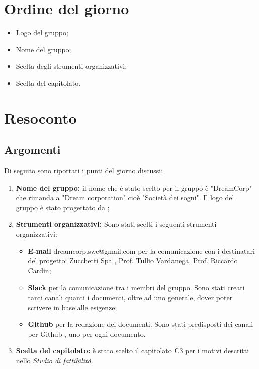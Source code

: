 \documentclass[12pt]{article}
\begin{document}
\section{Ordine del giorno}
    \begin{itemize}
        \item Logo del gruppo;
        \item Nome del gruppo;
        \item Scelta degli strumenti organizzativi;
        \item Scelta del capitolato.

    \end{itemize}
    
\newpage
\section{Resoconto}
    \subsection{Argomenti}
        Di seguito sono riportati i punti del giorno discussi:
    \begin{enumerate}
        \item \textbf{Nome del gruppo:} il nome che è stato scelto per il gruppo è "DreamCorp" che rimanda a "Dream corporation" cioè "Società dei sogni". Il logo del gruppo è stato progettato da \daG;
        \item \textbf{Strumenti organizzativi:} Sono stati scelti i seguenti strumenti organizzativi: 
        \begin{itemize}
            \item \textbf{E-mail} dreamcorp.swe@gmail.com per la comunicazione con i destinatari del progetto: Zucchetti Spa \pedice , Prof. Tullio Vardanega, Prof. Riccardo Cardin; 
            \item \textbf{Slack} per la comunicazione tra i membri del gruppo. Sono stati creati tanti canali quanti i documenti, oltre ad uno generale, dover poter scrivere in base alle esigenze;
            \item \textbf{Github} \pedice per la redazione dei documenti. Sono stati predisposti dei canali per Github \pedice, uno per ogni documento.
        \end{itemize}
        \item \textbf{Scelta del capitolato:} è stato scelto il capitolato C3 per i motivi descritti nello \textit{Studio di fattibilità}. 
    \end{enumerate}
\end{document}
